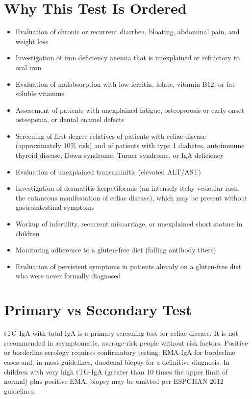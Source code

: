 \section*{Why This Test Is Ordered}
\begin{itemize}
  \item Evaluation of chronic or recurrent diarrhea, bloating, abdominal pain, and weight loss
  \item Investigation of iron deficiency anemia that is unexplained or refractory to oral iron
  \item Evaluation of malabsorption with low ferritin, folate, vitamin B12, or fat-soluble vitamins
  \item Assessment of patients with unexplained fatigue, osteoporosis or early-onset osteopenia, or dental enamel defects
  \item Screening of first-degree relatives of patients with celiac disease (approximately 10\% risk) and of patients with type 1 diabetes, autoimmune thyroid disease, Down syndrome, Turner syndrome, or IgA deficiency
  \item Evaluation of unexplained transaminitis (elevated ALT/AST)
  \item Investigation of dermatitis herpetiformis (an intensely itchy vesicular rash, the cutaneous manifestation of celiac disease), which may be present without gastrointestinal symptoms
  \item Workup of infertility, recurrent miscarriage, or unexplained short stature in children
  \item Monitoring adherence to a gluten-free diet (falling antibody titers)
  \item Evaluation of persistent symptoms in patients already on a gluten-free diet who were never formally diagnosed
\end{itemize}

\section*{Primary vs Secondary Test}
tTG-IgA with total IgA is a primary screening test for celiac disease. It is not recommended in asymptomatic, average-risk people without risk factors. Positive or borderline serology requires confirmatory testing: EMA-IgA for borderline cases and, in most guidelines, duodenal biopsy for a definitive diagnosis. In children with very high tTG-IgA (greater than 10 times the upper limit of normal) plus positive EMA, biopsy may be omitted per ESPGHAN 2012 guidelines.

